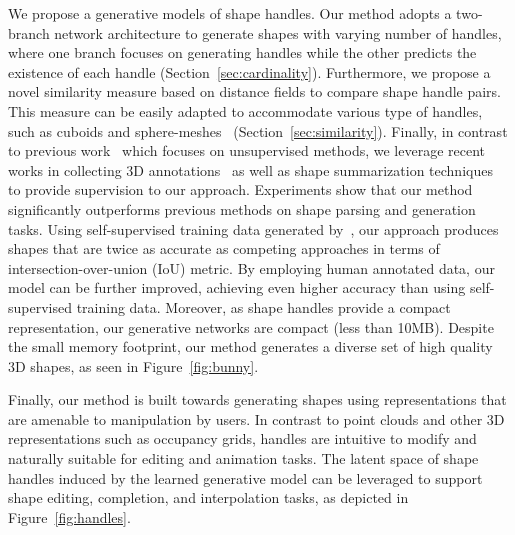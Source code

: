 We propose a generative models of shape handles. %
Our method adopts a two-branch network architecture to generate shapes with varying number of handles, where one branch focuses on generating handles while the other predicts the existence of each handle
(Section~\ref{sec:cardinality}). 
Furthermore, we propose a novel similarity measure based on distance fields to compare shape handle pairs. 
This measure can be easily adapted to accommodate various type of handles, such as cuboids and sphere-meshes~\cite{spheremesh}
(Section~\ref{sec:similarity}). 
Finally, in contrast to previous work~\cite{Tulsiani2017, Paschalidou2019} which focuses on unsupervised methods, we leverage recent works in collecting 3D annotations~\cite{partnet} as well as shape summarization techniques~\cite{spheremesh} to provide supervision to our approach.
Experiments show that our method significantly outperforms previous methods
on shape parsing and generation tasks.
Using self-supervised training data generated by~\cite{spheremesh}, our approach produces shapes that are twice as accurate as competing approaches in terms of intersection-over-union (IoU) metric. 
By employing human annotated data, our model can be further improved, achieving even higher accuracy than using self-supervised training data.
Moreover, as shape handles provide a compact representation, our generative networks are compact (less than 10MB).
Despite the small memory footprint,
our method generates a diverse set of
high quality 3D shapes, as seen in Figure~\ref{fig:bunny}.

Finally, our method is built towards generating shapes using
representations that are amenable to manipulation by users.
In contrast to point clouds and other 3D representations such as occupancy grids,
handles are intuitive to modify and naturally suitable for editing and animation tasks.
The latent space of shape handles induced by the learned generative model can be leveraged to support shape editing, completion, and interpolation tasks, as depicted in Figure~\ref{fig:handles}.

